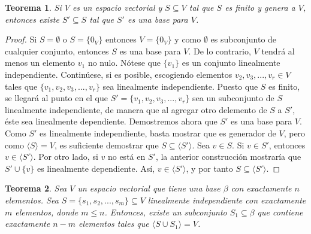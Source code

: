 \documentclass{book}
\newtheorem{theorem}{Teorema}
\begin{document}
\begin{theorem}
Si $V$ es un espacio vectorial y $S \subseteq V$ tal que $S$ es finito y genera a $V$, entonces existe $S' \subseteq S$ tal que $S'$ es una base para $V$.

\end{theorem}

\begin{proof}
Si $S= \emptyset$ o $S=\{0_V\}$ entonces $V=\{0_V\}$ y como $\emptyset$ es subconjunto de cualquier conjunto, entonces $S$ es una base para $V$. De lo contrario, $V$ tendrá al menos un elemento $v_1$ no nulo. Nótese que $\{v_1\}$ es un conjunto linealmente independiente. Continúese, si es posible, escogiendo elementos $v_2,v_3,...,v_r \in V$ tales que $\{ v_1,v_2,v_3,...,v_r \}$ sea linealmente independiente. Puesto que $S$ es finito, se llegará al punto en el que $S'=\{v_1,v_2,v_3,...,v_r\}$ sea un subconjunto de $S$ linealmente independiente, de manera que al agregar otro delemento de $S$ a $S'$, éste sea linealmente dependiente. Demostremos ahora que $S'$ es una base para $V$. Como $S'$ es linealmente independiente, basta mostrar que es generador de $V$, pero como $\langle S \rangle=V$, es suficiente demostrar que $S \subseteq \langle S' \rangle$. Sea $v \in S$. Si $v \in S'$, entonces $v \in \langle S' \rangle$. Por otro lado, si $v$ no está en $S'$, la anterior construcción mostraría que $S' \cup \{v\}$ es linealmente dependiente. Así, $v \in \langle S' \rangle$, y por tanto $S \subseteq \langle S' \rangle$.
\end{proof}

\begin{theorem}
Sea $V$ un espacio vectorial que tiene una base $\beta$ con exactamente $n$ elementos. Sea $S=\{s_1,s_2,...,s_m\} \subseteq V$ linealmente independiente con exactamente $m$ elementos, donde $m \leq n$. Entonces, existe un subconjunto $S_1 \subseteq \beta$ que contiene exactamente $n-m$ elementos tales que $\langle S \cup S_1 \rangle=V$. 
\end{theorem}
\end{document}
